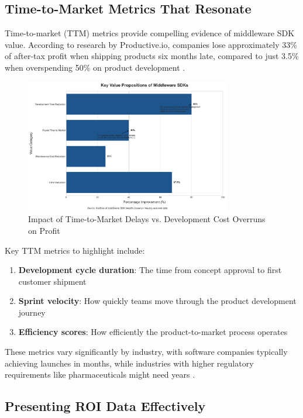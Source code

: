 \documentclass[11pt,a4paper]{article}
\begin{document}
\subsection{Time-to-Market Metrics That Resonate}

Time-to-market (TTM) metrics provide compelling evidence of middleware SDK value. According to research by Productive.io, companies lose approximately 33\% of after-tax profit when shipping products six months late, compared to just 3.5\% when overspending 50\% on product development \cite{productive2023}.

\begin{figure}[htbp]
    \centering
    \includegraphics[width=0.8\textwidth]{figures/visualization-20250510123358.png}
    \caption{Impact of Time-to-Market Delays vs. Development Cost Overruns on Profit}
    \label{fig:ttm-impact}
\end{figure}

Key TTM metrics to highlight include:

\begin{enumerate}
    \item \textbf{Development cycle duration}: The time from concept approval to first customer shipment
    \item \textbf{Sprint velocity}: How quickly teams move through the product development journey
    \item \textbf{Efficiency scores}: How efficiently the product-to-market process operates
\end{enumerate}

These metrics vary significantly by industry, with software companies typically achieving launches in months, while industries with higher regulatory requirements like pharmaceuticals might need years \cite{enkonix2023}.

\subsection{Presenting ROI Data Effectively}
\end{document}
